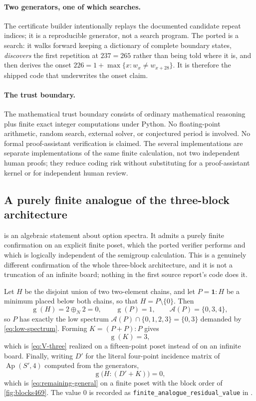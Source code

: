 \documentclass[11pt,letterpaper]{article}
\numberwithin{equation}{section}
\theoremstyle{definition}
\theoremstyle{remark}
\newcommand{\sg}{\operatorname{g}}
\newcommand{\opt}{\mathcal A}
\newcommand{\Ap}{\operatorname{Ap}}
\newcommand{\nimadd}{\mathbin{\oplus_{\!N}}}
\begin{document}
\paragraph{Two generators, one of which searches.}
The certificate builder  intentionally
replays the documented candidate repeat indices; it is a reproducible
generator, not a search program. The ported
 is a search: it walks forward
keeping a dictionary of complete boundary states, \emph{discovers} the
first repetition at $237=265$ rather than being told where it is, and
then derives the onset
$226=1+\max\{x:w_x\neq w_{x+28}\}$. It is therefore the shipped code that
underwrites the onset claim.

\paragraph{The trust boundary.}
The mathematical trust boundary consists of ordinary mathematical
reasoning plus finite exact integer computations under Python. No
floating-point arithmetic, random search, external solver, or conjectured
period is involved. No formal proof-assistant verification is claimed.
The several implementations are separate implementations of the same
finite calculation, not two independent human proofs; they reduce coding
risk without substituting for a proof-assistant kernel or for independent
human review.

\subsection{A purely finite analogue of the three-block architecture}
\label{sec:gadget}

 is an algebraic statement about option spectra. It
admits a purely finite confirmation on an explicit finite poset, which
the ported verifier performs and which is logically independent of the
semigroup calculation. This is a genuinely different confirmation of the
whole three-block architecture, and it is not a truncation of an infinite
board; nothing in the first source report's code does it.

Let $H$ be the disjoint union of two two-element chains, and let
$P=\mathbf1:H$ be a minimum placed below both chains, so that
$H=P\setminus\{0\}$. Then
\[
 \sg(H)=2\nimadd2=0,\qquad \sg(P)=1,\qquad \opt(P)=\{0,3,4\},
\]
so $P$ has exactly the low spectrum $\opt(P)\cap\{0,1,2,3\}=\{0,3\}$
demanded by \cref{eq:low-spectrum}. Forming $K=(P+P):P$ gives
\[
 \sg(K)=3,
\]
which is \cref{eq:V-three} realized on a fifteen-point poset instead of
on an infinite board. Finally, writing $D'$ for the literal four-point
incidence matrix of $\Ap(S',4)$ computed from the generators,
\begin{equation}\label{eq:gadget}
 \sg\bigl(H:(D'+K)\bigr)=0,
\end{equation}
which is \cref{eq:remaining-general} on a finite poset with the block
order of \cref{fig:blocks469}. The value 0 is recorded as
\texttt{finite\_analogue\_residual\_value} in
.
\end{document}
